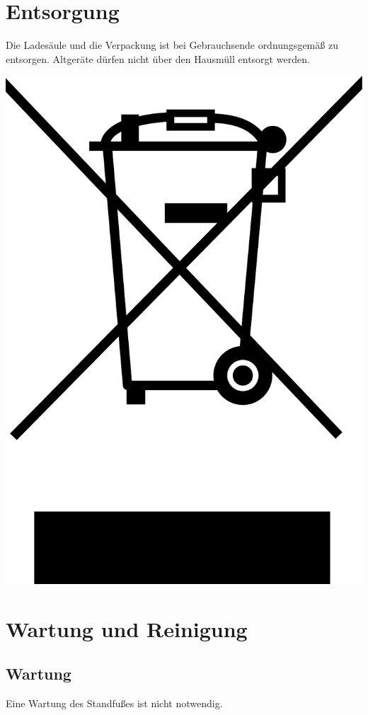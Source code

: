 \documentclass[a4paper,10pt]{article}
\begin{document}
\begin{multicols*}{2}
	\section{Entsorgung}
	\begin{minipage}{0.35\textwidth}
		Die Ladesäule und die Verpackung ist bei Gebrauchsende ordnungsgemäß zu
		entsorgen. Altgeräte dürfen nicht über den Hausmüll entsorgt werden.
	\end{minipage}\hfill
	\begin{minipage}{0.1\textwidth}
		\includegraphics[width=\linewidth]{./img/weee.pdf}
	\end{minipage}


	\section{Wartung und Reinigung}
	\subsection{Wartung}
	Eine Wartung des Standfußes ist nicht notwendig.


\end{multicols*}
\end{document}
